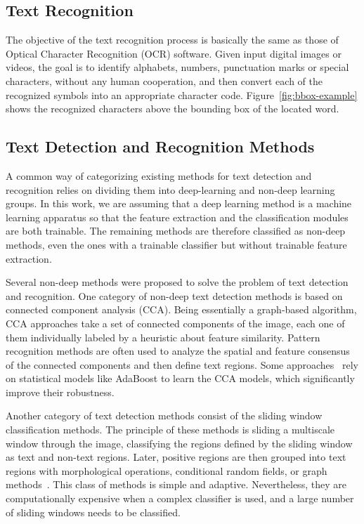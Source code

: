     \subsection{Text Recognition}
    The objective of the text recognition process is basically the same as those of Optical Character Recognition (OCR) software. Given input digital images or videos, the goal is to identify alphabets, numbers, punctuation marks or special characters, without any human cooperation, and then convert each of the recognized symbols into an appropriate character code. Figure~\ref{fig:bbox-example} shows the recognized characters above the bounding box of the located word. 
    
    \subsection{Text Detection and Recognition Methods}
    A common way of categorizing existing methods for text detection and recognition relies on dividing them into deep-learning and non-deep learning groups. In this work, we are assuming that a deep learning method is a machine learning apparatus so that the feature extraction and the classification modules are both trainable. The remaining methods are therefore classified as non-deep methods, even the ones with a trainable classifier but without trainable feature extraction. 
    
    Several non-deep methods were proposed to solve the problem of text detection and recognition. 
    One category of non-deep text detection methods is based on connected component analysis (CCA).  Being essentially a graph-based algorithm, CCA approaches take a set of connected components of the image, each one of them individually labeled by a heuristic about feature similarity. Pattern recognition methods are often used to analyze the spatial and feature consensus of the connected components and then define text regions. Some approaches~\cite{Lee2010,Kumuda2016,HyungIlKoo2013} rely on statistical models like AdaBoost to learn the CCA models, which significantly improve their robustness.  

    Another category of text detection methods consist of the sliding window classification methods. The principle of these methods is sliding a multiscale window through the image, classifying the regions defined by the sliding window as text and non-text regions. Later, positive regions are then grouped into text regions with morphological operations, conditional random fields, or graph methods~\cite{Lee2011,wang2011,Coates,Ng2011}. This class of methods is simple and adaptive. Nevertheless, they are computationally expensive when a complex classifier is used, and a large number of sliding windows needs to be classified. 
    
